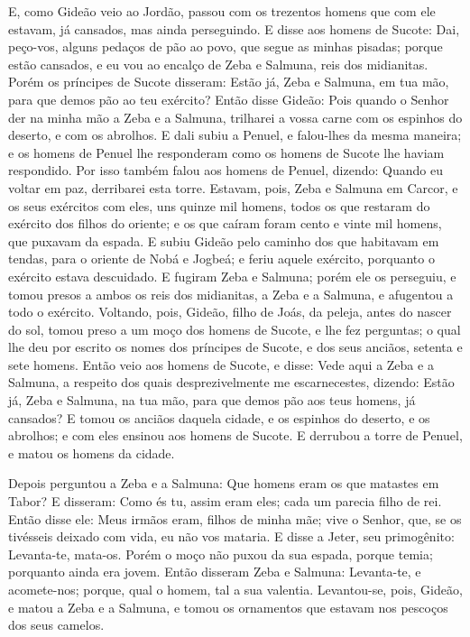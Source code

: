 E, como Gideão veio ao Jordão, passou com os trezentos homens que
com ele estavam, já cansados, mas ainda perseguindo. E disse aos
homens de Sucote: Dai, peço-vos, alguns pedaços de pão ao povo, que
segue as minhas pisadas; porque estão cansados, e eu vou ao encalço
de Zeba e Salmuna, reis dos midianitas. Porém os príncipes de
Sucote disseram: Estão já, Zeba e Salmuna, em tua mão, para que
demos pão ao teu exército? Então disse Gideão: Pois quando o
Senhor der na minha mão a Zeba e a Salmuna, trilharei a vossa carne
com os espinhos do deserto, e com os abrolhos. E dali subiu a
Penuel, e falou-lhes da mesma maneira; e os homens de Penuel lhe
responderam como os homens de Sucote lhe haviam respondido. Por
isso também falou aos homens de Penuel, dizendo: Quando eu voltar em
paz, derribarei esta torre. Estavam, pois, Zeba e Salmuna em
Carcor, e os seus exércitos com eles, uns quinze mil homens, todos
os que restaram do exército dos filhos do oriente; e os que caíram
foram cento e vinte mil homens, que puxavam da espada. E
subiu Gideão pelo caminho dos que habitavam em tendas, para o
oriente de Nobá e Jogbeá; e feriu aquele exército, porquanto o
exército estava descuidado. E fugiram Zeba e Salmuna; porém
ele os perseguiu, e tomou presos a ambos os reis dos midianitas, a
Zeba e a Salmuna, e afugentou a todo o exército. Voltando,
pois, Gideão, filho de Joás, da peleja, antes do nascer do sol,
tomou preso a um moço dos homens de Sucote, e lhe fez
perguntas; o qual lhe deu por escrito os nomes dos príncipes de
Sucote, e dos seus anciãos, setenta e sete homens. Então veio
aos homens de Sucote, e disse: Vede aqui a Zeba e a Salmuna, a
respeito dos quais desprezivelmente me escarnecestes, dizendo: Estão
já, Zeba e Salmuna, na tua mão, para que demos pão aos teus homens,
já cansados? E tomou os anciãos daquela cidade, e os espinhos
do deserto, e os abrolhos; e com eles ensinou aos homens de Sucote.
E derrubou a torre de Penuel, e matou os homens da cidade.

Depois perguntou a Zeba e a Salmuna: Que homens eram os que
matastes em Tabor? E disseram: Como és tu, assim eram eles; cada um
parecia filho de rei. Então disse ele: Meus irmãos eram,
filhos de minha mãe; vive o Senhor, que, se os tivésseis deixado com
vida, eu não vos mataria. E disse a Jeter, seu primogênito:
Levanta-te, mata-os. Porém o moço não puxou da sua espada, porque
temia; porquanto ainda era jovem. Então disseram Zeba e
Salmuna: Levanta-te, e acomete-nos; porque, qual o homem, tal a sua
valentia. Levantou-se, pois, Gideão, e matou a Zeba e a Salmuna, e
tomou os ornamentos que estavam nos pescoços dos seus camelos.

